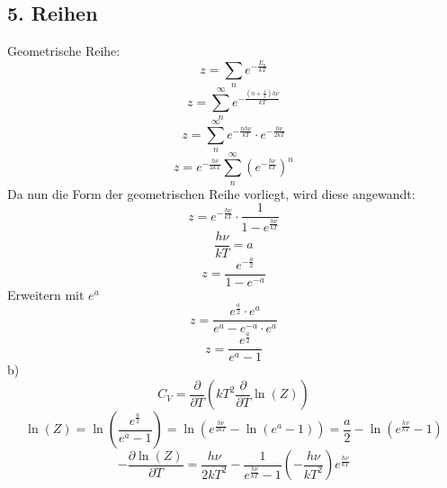 \documentclass{article}
\begin{document}
    \subsection*{5. Reihen}
    Geometrische Reihe:
    \begin{equation*}
        z = \sum_{n} e^{-\frac{E_n}{kT}}
    \end{equation*}
    \begin{equation*}
        z = \sum_{n}^{\infty} e^{-\frac{(n+\frac{1}{2})h\nu}{kT}}
    \end{equation*}
    \begin{equation*}
        z = \sum_{n}^{\infty} e^{-\frac{nh\nu}{kT}}\cdot e^{-\frac{h\nu}{2kT}}
    \end{equation*}
    \begin{equation*}
        z = e^{-\frac{h\nu}{2kT}} \sum_{n}^{\infty} (e^{-\frac{h\nu}{kT}})^n
    \end{equation*}
    Da nun die Form der geometrischen Reihe vorliegt, wird diese angewandt:
    \begin{equation*}
        z = e^{-\frac{h\nu}{kT}} \cdot \frac{1}{1 - e^{\frac{h\nu}{kT}}}
    \end{equation*}
    \begin{equation*}
        \frac{h\nu}{kT} = a
    \end{equation*}
    \begin{equation*}
        z = \frac{e^{-\frac{a}{2}}}{1-e^{-a}}
    \end{equation*}
    Erweitern mit $e^a$
    \begin{equation*}
        z = \frac{e^{\frac{a}{2}}\cdot e^a}{e^a-e^{-a} \cdot e^a}
    \end{equation*}
    \begin{equation*}
        z = \frac{e^\frac{a}{2}}{e^a-1}
    \end{equation*}
    b)
    \begin{equation*}
        C_V = \frac{\partial}{\partial T}\left(kT^2\frac{\partial}{\partial T}\ln (Z)\right)
    \end{equation*}
    \begin{equation*}
        \ln (Z) = \ln\left(\frac{e^\frac{a}{2}}{e^{a}-1}\right) = \ln\left(e^\frac{h\nu}{2kT}-\ln\left(e^a-1\right)\right) = \frac{a}{2} - \ln\left(e^\frac{h\nu}{kT}-1\right)
    \end{equation*}
    \begin{equation*}
        -\frac{\partial \ln(Z)}{\partial T} = \frac{h\nu}{2kT^2} - \frac{1}{e^{\frac{h\nu}{kT}}-1}\left(-\frac{h\nu}{kT^2}\right)e^{\frac{h\nu}{kT}}
    \end{equation*}
\end{document}
